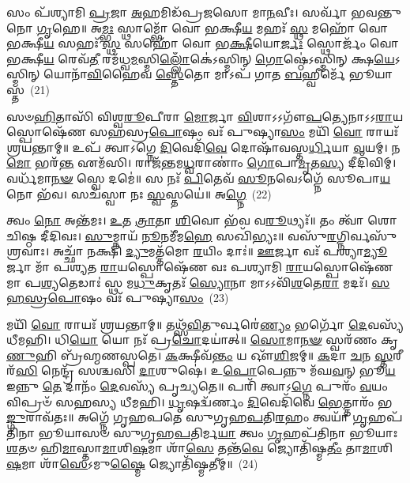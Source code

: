 {\anuvakamend[{\-\ul{𑌆}\-\-\ul{𑌹𑍁}\-𑌵𑌧𑍍𑌯𑍈᳴ \ul{𑌰}\-𑌯𑌿𑌂 \ul{𑌮𑍇} 𑌵𑌰𑍍𑌚᳴𑌸𑌾 \ul{𑌸}\-𑌪𑍍𑌤𑌦᳴𑌶 𑌚}]}%

𑌸𑌂 𑌪᳴𑌶𑍍𑌯𑌾𑌮𑌿 \ul{𑌪𑍍𑌰}\-𑌜𑌾 \ul{𑌅}\-𑌹𑌮𑌿𑌡᳴𑌪𑍍𑌰𑌜𑌸𑍋 𑌮𑌾\-\ul{𑌨}\-𑌵𑍀𑌃। 𑌸𑌰𑍍𑌵𑌾᳴ 𑌭𑌵𑌨𑍍𑌤𑍁 𑌨𑍋 \ul{𑌗𑍃}\-𑌹𑍇॥ 𑌅\-\ul{𑌮𑍍𑌭𑌃} 𑌸𑍍𑌥𑌾𑌮𑍍𑌭𑍋᳴ 𑌵𑍋 𑌭𑌕𑍍𑌷𑍀\-\ul{𑌯} 𑌮𑌹𑌃᳴ \ul{𑌸𑍍𑌥} 𑌮𑌹𑍋᳴ 𑌵𑍋 𑌭𑌕𑍍𑌷𑍀\-\ul{𑌯} 𑌸𑌹𑌃᳴ \ul{𑌸𑍍𑌥} 𑌸𑌹𑍋᳴ 𑌵𑍋 𑌭\-\ul{𑌕𑍍𑌷𑍀}\-𑌯𑍋\-\ul{𑌰𑍍𑌜𑌃} 𑌸𑍍𑌥𑍋𑌰𑍍𑌜𑌂᳴ 𑌵𑍋 𑌭𑌕𑍍𑌷𑍀\-\ul{𑌯} 𑌰𑍇𑌵᳴\-\ul{𑌤𑍀} 𑌰𑌮᳴𑌧𑍍𑌵\-\ul{𑌮}\-𑌸𑍍𑌮𑌿\-\ul{𑌲𑍍𑌲𑍋𑌁}\-𑌕𑍇॑\-𑌽𑌸𑍍𑌮𑌿𑌨𑍍 \ul{𑌗𑍋}\-𑌷𑍍𑌠𑍇॑\-𑌽𑌸𑍍𑌮𑌿𑌨𑍍 𑌕𑍍𑌷\-\ul{𑌯𑍇}\-\-𑌽𑌸𑍍𑌮𑌿𑌨𑍍 𑌯𑍋𑌨𑌾᳴\-\ul{𑌵𑌿}\-𑌹𑍈𑌵 \ul{𑌸𑍍𑌤𑍇}\-𑌤𑍋 𑌮𑌾\-𑌽𑌪᳴ 𑌗𑌾𑌤 \ul{𑌬}\-𑌹𑍍𑌵𑍀𑌰𑍍𑌮𑍇᳴ 𑌭𑍂𑌯𑌾𑌸𑍍𑌤~(21)

𑌸𑍞\-\ul{𑌹𑌿}\-𑌤𑌾𑌸𑌿᳴ 𑌵𑌿𑌶𑍍𑌵\-\ul{𑌰𑍂}\-𑌪𑍀𑌰𑌾 \ul{𑌮𑍋}\-𑌰𑍍𑌜𑌾 \ul{𑌵𑌿}\-𑌶𑌾\-𑌽\-𑌽𑌗𑍗᳴\-\ul{𑌪}\-𑌤𑍍𑌯𑍇𑌨𑌾\-𑌽\-𑌽\-\ul{𑌰𑌾}\-𑌯𑌸𑍍𑌪𑍋𑌷𑍇᳴𑌣 𑌸𑌹𑌸𑍍𑌰\-\ul{𑌪𑍋}\-𑌷𑌂 𑌵𑌃᳴ 𑌪𑍁𑌷𑍍𑌯𑌾\-\ul{𑌸𑌂} 𑌮𑌯𑌿᳴ \ul{𑌵𑍋} 𑌰𑌾𑌯𑌃᳴ 𑌶𑍍𑌰𑌯𑌨𑍍𑌤𑌾𑌮𑍍॥ 𑌉𑌪᳴ 𑌤𑍍𑌵𑌾\-𑌽𑌗𑍍𑌨𑍇 \ul{𑌦𑌿}\-𑌵𑍇𑌦𑌿᳴\-\ul{𑌵𑍇} 𑌦𑍋𑌷𑌾᳴𑌵𑌸𑍍𑌤\-\ul{𑌰𑍍𑌧𑌿}\-𑌯𑌾 \ul{𑌵}\-𑌯𑌮𑍍। 𑌨\-\ul{𑌮𑍋} 𑌭𑌰᳴\-\ul{𑌨𑍍𑌤} 𑌏𑌮᳴𑌸𑌿। 𑌰𑌾𑌜᳴𑌨𑍍𑌤𑌮\-\ul{𑌧𑍍𑌵}\-𑌰𑌾𑌣𑌾𑌂॑ \ul{𑌗𑍋}\-𑌪𑌾\-\ul{𑌮𑍃}\-𑌤\-\ul{𑌸𑍍𑌯} 𑌦𑍀𑌦𑌿᳴𑌵𑌿𑌮𑍍। 𑌵𑌰𑍍𑌧᳴𑌮𑌾\-\ul{𑌨}\-\-\ul{𑍟} 𑌸𑍍𑌵𑍇 𑌦𑌮𑍇॑॥ 𑌸 𑌨𑌃᳴ \ul{𑌪𑌿}\-𑌤𑍇𑌵᳴ \ul{𑌸𑍂}\-𑌨𑌵𑍇\-𑌽𑌗𑍍𑌨𑍇᳴ 𑌸𑍂𑌪𑌾\-\ul{𑌯}\-𑌨𑍋 𑌭᳴𑌵। 𑌸𑌚᳴𑌸𑍍𑌵𑌾 𑌨𑌃 \ul{𑌸𑍍𑌵}\-𑌸𑍍𑌤𑌯𑍇॑॥ 𑌅\-\ul{𑌗𑍍𑌨𑍇}\-~(22)

𑌤𑍍𑌵𑌂 \ul{𑌨𑍋} 𑌅𑌨𑍍𑌤᳴𑌮𑌃। \ul{𑌉}\-𑌤 \ul{𑌤𑍍𑌰𑌾}\-𑌤𑌾 \ul{𑌶𑌿}\-𑌵𑍋 𑌭᳴𑌵 𑌵\-\ul{𑌰𑍂}\-𑌥𑍍𑌯𑌃᳴॥ 𑌤𑌂 𑌤𑍍𑌵𑌾᳴ 𑌶𑍋𑌚𑌿𑌷𑍍𑌠 𑌦𑍀𑌦𑌿𑌵𑌃। \ul{𑌸𑍁}\-𑌮𑍍𑌨𑌾𑌯᳴ \ul{𑌨𑍂}\-𑌨𑌮𑍀᳴𑌮\-\ul{𑌹𑍇} 𑌸𑌖𑌿᳴𑌭𑍍𑌯𑌃॥ 𑌵𑌸𑍁᳴\-\ul{𑌰}\-𑌗𑍍𑌨𑌿𑌰𑍍𑌵𑌸𑍁᳴𑌶𑍍𑌰𑌵𑌾𑌃। 𑌅𑌚𑍍𑌛𑌾᳴ 𑌨𑌕𑍍𑌷𑌿 \ul{𑌦𑍍𑌯𑍁}\-𑌮𑌤𑍍𑌤᳴𑌮𑍋 \ul{𑌰}\-𑌯𑌿𑌂 𑌦𑌾𑌃॑॥ \ul{𑌊}\-𑌰𑍍𑌜𑌾 𑌵𑌃᳴ 𑌪𑌶𑍍𑌯𑌾\-\ul{𑌮𑍍𑌯𑍂}\-𑌰𑍍𑌜𑌾 𑌮𑌾᳴ 𑌪𑌶𑍍𑌯𑌤 \ul{𑌰𑌾}\-𑌯𑌸𑍍𑌪𑍋𑌷𑍇᳴𑌣 𑌵𑌃 𑌪𑌶𑍍𑌯𑌾𑌮𑌿 \ul{𑌰𑌾}\-𑌯𑌸𑍍𑌪𑍋𑌷𑍇᳴𑌣 𑌮𑌾 𑌪\-\ul{𑌶𑍍𑌯}\-𑌤𑍇𑌡𑌾𑌃॑ 𑌸𑍍𑌥 𑌮\-\ul{𑌧𑍁}\-𑌕𑍃𑌤𑌃᳴ \ul{𑌸𑍍𑌯𑍋}\-𑌨𑌾 𑌮𑌾\-𑌽\-𑌽𑌵𑌿᳴\-\ul{𑌶}\-𑌤𑍇\-\ul{𑌰𑌾} 𑌮𑌦𑌃᳴। \ul{𑌸}\-\-\ul{𑌹}\-\-\ul{𑌸𑍍𑌰}\-\-\ul{𑌪𑍋}\-𑌷𑌂 𑌵𑌃᳴ 𑌪𑍁𑌷𑍍𑌯𑌾\-\ul{𑌸𑌂}\-~(23)

𑌮𑌯𑌿᳴ \ul{𑌵𑍋} 𑌰𑌾𑌯𑌃᳴ 𑌶𑍍𑌰𑌯𑌨𑍍𑌤𑌾𑌮𑍍॥ 𑌤𑌥𑍍𑌸᳴\-\ul{𑌵𑌿}\-𑌤𑍁𑌰𑍍𑌵𑌰𑍇॑\-\ul{𑌣𑍍𑌯𑌂} 𑌭𑌰𑍍𑌗𑍋᳴ \ul{𑌦𑍇}\-𑌵𑌸𑍍𑌯᳴ 𑌧𑍀𑌮𑌹𑌿। 𑌧𑌿\-\ul{𑌯𑍋} 𑌯𑍋 𑌨𑌃᳴ 𑌪𑍍𑌰\-\ul{𑌚𑍋}\-𑌦𑌯𑌾॑𑌤𑍍॥ \ul{𑌸𑍋}\-𑌮𑌾\-\ul{𑌨}\-\-\ul{𑍟} 𑌸𑍍𑌵𑌰᳴𑌣𑌂 𑌕𑍃\-\ul{𑌣𑍁}\-𑌹𑌿 𑌬𑍍𑌰᳴𑌹𑍍𑌮𑌣𑌸𑍍𑌪𑌤𑍇। \ul{𑌕}\-𑌕𑍍𑌷𑍀𑌵᳴\-\ul{𑌨𑍍𑌤𑌂} 𑌯 𑌔᳴\-\ul{𑌶𑌿}\-𑌜𑌮𑍍॥ \ul{𑌕}\-𑌦𑌾 \ul{𑌚}\-𑌨 \ul{𑌸𑍍𑌤}\-𑌰𑍀𑌰᳴\-\ul{𑌸𑌿} 𑌨𑍇𑌨𑍍𑌦𑍍𑌰᳴ 𑌸𑌶𑍍𑌚𑌸𑌿 \ul{𑌦𑌾}\-𑌶𑍁𑌷𑍇॑। 𑌉\-\ul{𑌪𑍋}\-𑌪𑍇𑌨𑍍𑌨𑍁 𑌮᳴𑌘\-\ul{𑌵}\-𑌨𑍍 𑌭𑍂\-\ul{𑌯} 𑌇𑌨𑍍𑌨𑍁 \ul{𑌤𑍇} 𑌦𑌾𑌨𑌂᳴ \ul{𑌦𑍇}\-𑌵𑌸𑍍𑌯᳴ 𑌪𑍃𑌚𑍍𑌯𑌤𑍇॥ 𑌪𑌰𑌿᳴ 𑌤𑍍𑌵𑌾𑌽\-\ul{𑌗𑍍𑌨𑍇} 𑌪𑍁𑌰𑌂᳴ \ul{𑌵}\-𑌯𑌂 𑌵𑌿𑌪𑍍𑌰𑍞᳴ 𑌸𑌹𑌸𑍍𑌯 𑌧𑍀𑌮𑌹𑌿। \ul{𑌧𑍃}\-𑌷𑌦𑍍𑌵᳴𑌰𑍍𑌣𑌂 \ul{𑌦𑌿}\-𑌵𑍇𑌦𑌿᳴𑌵𑍇 \ul{𑌭𑍇}\-𑌤𑍍𑌤𑌾𑌰𑌂᳴ 𑌭\-\ul{𑌙𑍍𑌗𑍁}\-𑌰𑌾𑌵᳴𑌤𑌃॥ 𑌅𑌗𑍍𑌨𑍇᳴ 𑌗𑍃𑌹𑌪𑌤𑍇 𑌸𑍁𑌗𑍃𑌹\-\ul{𑌪}\-𑌤𑌿\-\ul{𑌰}\-𑌹𑌂 𑌤𑍍𑌵𑌯𑌾᳴ \ul{𑌗𑍃}\-𑌹𑌪᳴𑌤𑌿𑌨𑌾 𑌭𑍂𑌯𑌾𑌸𑍞 𑌸𑍁𑌗𑍃𑌹\-\ul{𑌪}\-𑌤𑌿𑌰𑍍𑌮\-\ul{𑌯𑌾} 𑌤𑍍𑌵𑌂 \ul{𑌗𑍃}\-𑌹𑌪᳴𑌤𑌿𑌨𑌾 𑌭𑍂𑌯𑌾𑌃 \ul{𑌶}\-𑌤𑍞 𑌹𑌿\-\ul{𑌮𑌾}\-𑌸𑍍𑌤𑌾\-\ul{𑌮𑌾}\-𑌶𑌿\-\ul{𑌷}\-𑌮𑌾 𑌶𑌾᳴\-\ul{𑌸𑍇} 𑌤𑌨𑍍𑌤᳴\-\ul{𑌵𑍇} 𑌜𑍍𑌯𑍋𑌤𑌿᳴𑌷𑍍𑌮\-\ul{𑌤𑍀𑌂} 𑌤𑌾\-\ul{𑌮𑌾}\-𑌶𑌿\-\ul{𑌷}\-𑌮𑌾 𑌶𑌾᳴\-\ul{𑌸𑍇}\-\-𑌽𑌮𑍁\-\ul{𑌷𑍍𑌮𑍈} 𑌜𑍍𑌯𑍋𑌤𑌿᳴𑌷𑍍𑌮𑌤𑍀𑌮𑍍॥~(24)

